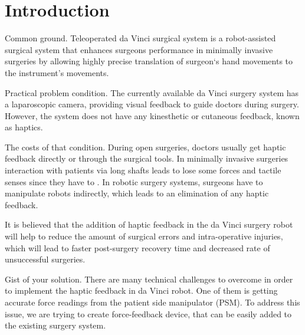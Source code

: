\chapter{Introduction}
\label{intro} %


Common ground. Teleoperated da Vinci surgical system is a robot-assisted surgical system that enhances surgeons performance in minimally invasive surgeries by allowing highly precise translation of surgeon`s hand movements to the instrument's movements. 

Practical problem condition. The currently available da Vinci surgery system has a laparoscopic camera, providing visual feedback to guide doctors during surgery. However, the system does not have any kinesthetic or cutaneous feedback, known as haptics.\cite{_intuitive_2018} 

The costs of that condition. 
During open surgeries, doctors usually get haptic feedback directly or through the surgical tools. In minimally invasive surgeries interaction with patients via long shafts leads to lose some forces and tactile senses since they have to . In robotic surgery systems, surgeons have to manipulate robots indirectly, which leads to an elimination of any haptic feedback. \cite{okamura_haptic_2009} 

It is believed that the addition of haptic feedback in the da Vinci surgery robot will help to reduce the amount of surgical errors and intra-operative injuries, which will lead to faster post-surgery recovery time and decreased rate of unsuccessful surgeries. \cite{reiley_effects_2008, van_der_meijden_value_2009, okamura_haptic_2009}

Gist of your solution. There are many technical challenges to overcome in order to implement the haptic feedback in da Vinci robot. One of them is getting accurate force readings from the patient side manipulator (PSM). To address this issue, we are trying to create force-feedback device, that can be easily added to the existing surgery system.